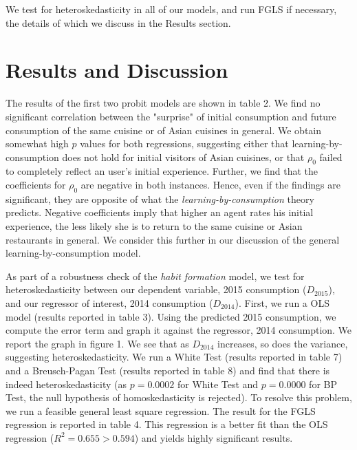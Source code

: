 \documentclass[Journal,letterpaper, NoLineNumbers]{ascelike-new}
\begin{document}
    We test for heteroskedasticity in all of our models, and run FGLS if necessary, the details of which we discuss in the Results section.
    
\section{Results and Discussion}
The results of the first two probit models are shown in table 2. We find no significant correlation between the "surprise" of initial consumption and future consumption of the same cuisine or of Asian cuisines in general. We obtain somewhat high $p$ values for both regressions, suggesting either that learning-by-consumption does not hold for initial visitors of Asian cuisines, or that $\rho_0$ failed to completely reflect an user's initial experience. Further, we find that the coefficients for $\rho_0$ are negative in both instances. Hence, even if the findings are significant, they are opposite of what the \textit{learning-by-consumption} theory predicts. Negative coefficients imply that higher an agent rates his initial experience, the less likely she is to return to the same cuisine or Asian restaurants in general. We consider this further in our discussion of the general learning-by-consumption model. 

As part of a robustness check of the \textit{habit formation} model, we test for heteroskedasticity between our dependent variable, 2015 consumption ($D_{2015}$), and our regressor of interest, 2014 consumption ($D_{2014}$). First, we run a OLS model (results reported in table 3). Using the predicted 2015 consumption, we compute the error term and graph it against the regressor, 2014 consumption. We report the graph in figure 1. We see that as $D_{2014}$ increases, so does the variance, suggesting heteroskedasticity. We run a White Test (results reported in table 7) and a Breusch-Pagan Test (results reported in table 8) and find that there is indeed heteroskedasticity (as $p = 0.0002$ for White Test and $p=0.0000$ for BP Test, the null hypothesis of homoskedasticity is rejected). To resolve this problem, we run a feasible general least square regression. The result for the FGLS regression is reported in table 4. This regression is a better fit than the OLS regression ($R^2 = 0.655 > 0.594$) and yields highly significant results. 
\end{document}
